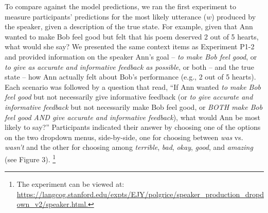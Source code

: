 To compare against the model predictions, we ran the first experiment to measure participants'
predictions for the most likely utterance (\(w\)) produced by the
speaker, given a description of the true state. For example, given that
Ann wanted to make Bob feel good but felt that his poem deserved 2 out
of 5 hearts, what would she say? 
We presented the same context items as Experiment P1-2 and provided information on the speaker Ann's goal -- \emph{to make Bob feel good},
or \emph{to give as accurate and informative feedback as possible}, or
both -- and the true state -- how Ann actually felt about Bob's
performance (e.g., 2 out of 5 hearts). 
Each scenario was followed by a question that read, ``If Ann wanted
\emph{to make Bob feel good} but not necessarily give informative
feedback (or \emph{to give accurate and informative feedback} but not
necessarily make Bob feel good, or \emph{BOTH make Bob feel good AND
give accurate and informative feedback}), what would Ann be most likely
to say?'' Participants indicated their answer by choosing one of the
options on the two dropdown menus, side-by-side, one for choosing
between \emph{was} vs. \emph{wasn't} and the other for choosing among
\emph{terrible}, \emph{bad}, \emph{okay}, \emph{good}, and
\emph{amazing} (see Figure 3).
\footnote{The experiment can be viewed at: \url{https://langcog.stanford.edu/expts/EJY/polgrice/speaker_production_dropdown_v2/speaker.html.}}

